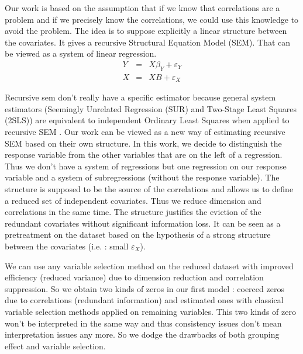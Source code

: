 \documentclass[11pt,a4paper]{article}
\begin{document}
	Our work is based on the assumption that if we know that correlations are a problem and if we precisely know the correlations, we could use this knowledge to avoid the problem.
	The idea is to suppose explicitly a linear structure between the covariates. It gives a recursive Structural Equation Model (SEM)\cite{davidson1993estimation}. That can be viewed as a system of linear regression. 	
		\begin{eqnarray}
		Y&=& X\beta_Y+\varepsilon_Y \\
		X&=&XB+ \varepsilon_{X} 
\end{eqnarray}				

	Recursive sem don't really have a specific estimator because general system estimators (Seemingly Unrelated Regression (SUR)\cite{SURzellner} and Two-Stage Least Squares (2SLS)) are equivalent to independent Ordinary Least Squares when applied to recursive SEM \cite{TIMM}. Our work can be viewed as a new way of estimating recursive SEM based on their own structure.
	  In this work, we decide to distinguish the response variable from the other variables that are on the left of a regression. Thus we don't have a system of regressions but one regression on our response variable and a system of subregressions (without the response variable).
	  The structure is supposed to be the source of the correlations and allows us to define a reduced set of independent covariates. Thus we reduce dimension and correlations in the same time. The structure justifies the eviction of the redundant covariates without significant information loss. It can be seen as a pretreatment on the dataset based on the hypothesis of a strong structure between the covariates (i.e. : small $\varepsilon_X$).
	  
	We can use any variable selection method on the reduced dataset with improved efficiency (reduced variance) due to dimension reduction and correlation suppression. So we obtain two kinds of zeros in our first model : coerced zeros due to correlations (redundant information) and estimated ones with classical variable selection methods applied on remaining variables. This two kinds of zero won't be interpreted in the same way and thus consistency issues don't mean interpretation issues any more. So we dodge the drawbacks of both grouping effect and variable selection.
 	
% 	
% 	
% 	
 	
\end{document}
